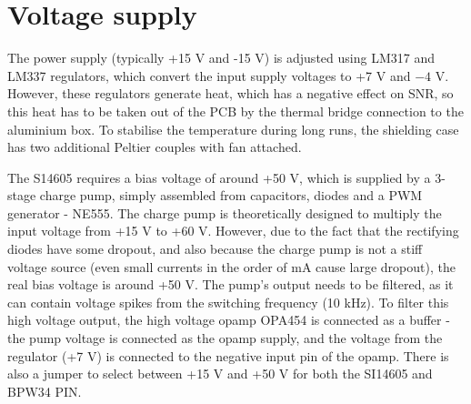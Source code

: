 \section{Voltage supply}
The power supply (typically +15 V and -15 V) is adjusted using LM317 and LM337 regulators, which convert the input supply voltages to +7 V and $-4$ V. However, these regulators generate heat, which has a negative effect on SNR, so this heat has to be taken out of the PCB by the thermal bridge connection to the aluminium box. To stabilise the temperature during long runs, the shielding case has two additional Peltier couples with fan attached.
\par
The S14605 requires a bias voltage of around +50 V, which is supplied by a 3-stage charge pump, simply assembled from capacitors, diodes and a PWM generator - NE555. The charge pump is theoretically designed to multiply the input voltage from +15 V to +60 V. However, due to the fact that the rectifying diodes have some dropout, and also because the charge pump is not a stiff voltage source (even small currents in the order of mA cause large dropout), the real bias voltage is around +50 V. The pump's output needs to be filtered, as it can contain voltage spikes from the switching frequency (10 kHz). To filter this high voltage output, the high voltage opamp OPA454 is connected as a buffer - the pump voltage is connected as the opamp supply, and the voltage from the regulator (+7 V) is connected to the negative input pin of the opamp. There is also a jumper to select between +15 V and +50 V for both the SI14605 and BPW34 PIN.
%

